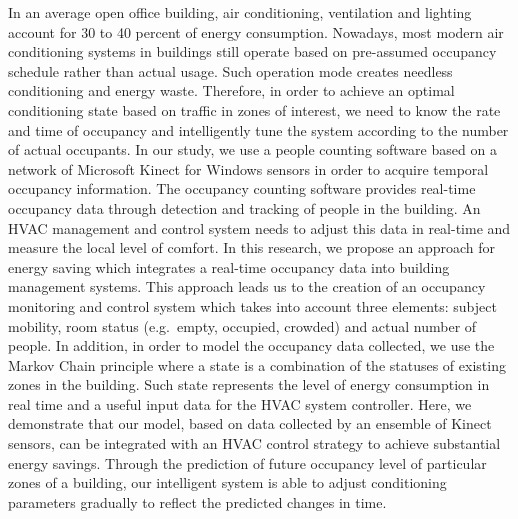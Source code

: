 In an average open office building, air conditioning, ventilation and
lighting account for 30 to 40 percent of energy consumption. Nowadays,
most modern air conditioning systems in buildings still operate based on
pre-assumed occupancy schedule rather than actual usage. Such operation mode creates
needless conditioning and energy waste. Therefore, in order to achieve
an optimal conditioning state based on  traffic in zones of interest,
we need to know the rate and time of occupancy and intelligently tune
the system according to the number of actual occupants. In our
study, we use a people counting software based on a network of
Microsoft Kinect for Windows sensors in order to acquire temporal
occupancy information. The occupancy counting software provides
real-time occupancy data through detection and tracking of people in
the building.  An HVAC management and control system needs to adjust
this data in real-time and measure the local level of comfort. In
this research, we propose an approach for energy saving which
integrates a real-time occupancy data into building management
systems. This approach leads us to the creation of an occupancy
monitoring and control system which takes into account three elements:
subject mobility, room status (e.g.\ empty, occupied, crowded) and
actual number of people.  In addition, in order to model the occupancy
data collected, we use the Markov Chain principle where a state is a
combination of the statuses of existing zones in the building. Such
state represents the level of energy consumption in real time and a
useful input data for the HVAC system controller.  Here, we
demonstrate that our model, based on data collected by an ensemble of
Kinect sensors, can be integrated with an HVAC control strategy to
achieve substantial energy savings. Through the prediction of future
occupancy level of particular zones of a building, our intelligent
system is able to adjust conditioning parameters gradually to reflect
the predicted changes in time. 


